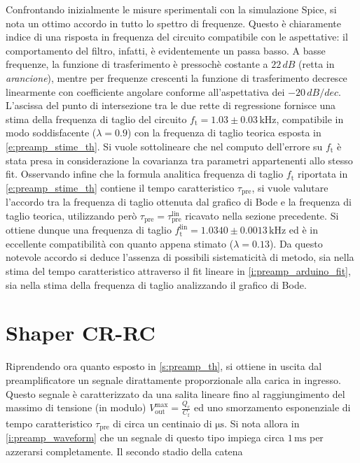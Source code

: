 \documentclass[a4paper,11pt]{article} %
\begin{document}
Confrontando inizialmente le misure sperimentali con la simulazione Spice, si nota un ottimo accordo in tutto lo spettro
di frequenze. Questo è chiaramente indice di una risposta in frequenza del circuito compatibile con le aspettative: il
comportamento del filtro, infatti, è evidentemente un passa basso. A basse frequenze, la funzione di trasferimento è
pressochè costante a $22\,\si{dB}$ (retta in \textit{arancione}), mentre per frequenze crescenti la funzione di
trasferimento decresce linearmente con coefficiente angolare conforme all'aspettativa dei $-20\,\si{dB/dec}$. L'ascissa
del punto di intersezione tra le due rette di regressione fornisce una stima della frequenza di taglio del circuito
$f_{\text{t}} = 1.03 \pm 0.03 \,\si{\kHz}$, compatibile in modo soddisfacente ($\lambda = 0.9$) con la frequenza di
taglio teorica esposta in \autoref{e:preamp_stime_th}. Si vuole sottolineare che nel computo dell'errore su
$f_{\text{t}}$ è stata presa in considerazione la covarianza tra parametri appartenenti allo stesso fit. Osservando
infine che la formula analitica frequenza di taglio $f_{\text{t}}$ riportata in \autoref{e:preamp_stime_th} contiene il
tempo caratteristico $\tau_{\text{pre}}$, si vuole valutare l'accordo tra la frequenza di taglio ottenuta dal grafico di
Bode e la frequenza di taglio teorica, utilizzando però $\tau_{\text{pre}}=\tau_{\text{pre}}^{\text{lin}}$ ricavato
nella sezione precedente. Si ottiene dunque una frequenza di taglio $f_{\text{t}}^{\text{lin}} = 1.0340 \pm 0.0013
\,\si{\kHz}$ ed è in eccellente compatibilità con quanto appena stimato ($\lambda = 0.13$). Da questo notevole accordo
si deduce l'assenza di possibili sistematicità di metodo, sia nella stima del tempo caratteristico attraverso il fit
lineare in \autoref{i:preamp_arduino_fit}, sia nella stima della frequenza di taglio analizzando il grafico di Bode. 



\section{Shaper CR-RC}\label{s:shaper} 

Riprendendo ora quanto esposto in \autoref{s:preamp_th}, si ottiene in uscita dal preamplificatore un segnale
dirattamente proporzionale alla carica in ingresso. Questo segnale è caratterizzato da una salita lineare fino al
raggiungimento del massimo di tensione (in modulo) $V_{\text{out}}^{\text{max}}=\frac{Q_{\text{c}}}{C_{\text{f}}}$ ed
uno smorzamento esponenziale di tempo caratteristico $\tau_{\text{pre}}$ di circa un centinaio di $\si{\us}$. Si nota
allora in \autoref{i:preamp_waveform} che un segnale di questo tipo impiega circa $1\,\si{\milli\second}$ per azzerarsi
completamente. Il secondo stadio della catena 
\end{document}

